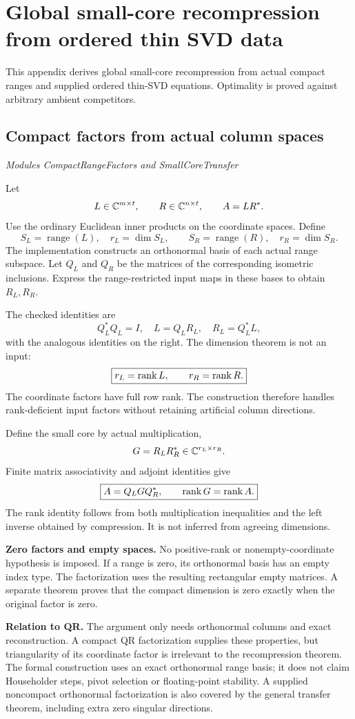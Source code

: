 \clearpage\FloatBarrier\section{Global small-core recompression from ordered thin SVD data}\label{supp6:section:001}
This appendix derives global small-core recompression from actual compact ranges and supplied ordered thin-SVD equations. Optimality is proved against arbitrary ambient competitors.\par

\subsection{Compact factors from actual column spaces}\label{supp6:subsection:001}\textit{Modules CompactRangeFactors and SmallCoreTransfer}\par
Let
\[
L\in\C^{m\times t},\qquad R\in\C^{n\times t},\qquad A=LR^*.
\]
Use the ordinary Euclidean inner products on the coordinate spaces. Define
\[
S_L=\operatorname{range}(L),\quad r_L=\dim S_L,
\qquad S_R=\operatorname{range}(R),\quad r_R=\dim S_R.
\]
The implementation constructs an orthonormal basis of each actual range subspace. Let $Q_L$ and $Q_R$ be the matrices of the corresponding isometric inclusions. Express the range-restricted input maps in these bases to obtain $R_L,R_R$.

The checked identities are
\[
\boxed{Q_L^*Q_L=I,\quad L=Q_LR_L,\quad R_L=Q_L^*L,}
\]
with the analogous identities on the right. The dimension theorem is not an input:
\[
\boxed{r_L=\operatorname{rank} L,\qquad r_R=\operatorname{rank} R.}
\]
The coordinate factors have full row rank. The construction therefore handles rank-deficient input factors without retaining artificial column directions.

Define the small core by actual multiplication,
\[
G=R_LR_R^*\in\C^{r_L\times r_R}.
\]
Finite matrix associativity and adjoint identities give
\[
\boxed{A=Q_LGQ_R^*,\qquad \operatorname{rank} G=\operatorname{rank} A.}
\]
The rank identity follows from both multiplication inequalities and the left inverse obtained by compression. It is not inferred from agreeing dimensions.

\textbf{Zero factors and empty spaces.} No positive-rank or nonempty-coordinate hypothesis is imposed. If a range is zero, its orthonormal basis has an empty index type. The factorization uses the resulting rectangular empty matrices. A separate theorem proves that the compact dimension is zero exactly when the original factor is zero.

\textbf{Relation to QR.} The argument only needs orthonormal columns and exact reconstruction. A compact QR factorization supplies these properties, but triangularity of its coordinate factor is irrelevant to the recompression theorem. The formal construction uses an exact orthonormal range basis; it does not claim Householder steps, pivot selection or floating-point stability. A supplied noncompact orthonormal factorization is also covered by the general transfer theorem, including extra zero singular directions.



